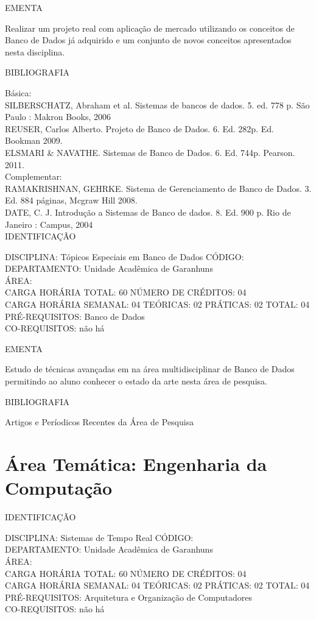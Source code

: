 \documentclass[
	12pt,				%
	openright,			%
  oneside,     %
	a4paper,			%
	chapter=TITLE,		%
	english,			%
	french,				%
	spanish,			%
	brazil				%
	]{abntex2}
\begin{document}
\begin{apendicesenv}
EMENTA 

Realizar um projeto real com aplicação de mercado utilizando os
conceitos de Banco de Dados já adquirido e um conjunto de novos
conceitos apresentados nesta disciplina.

BIBLIOGRAFIA 

Básica:\\
SILBERSCHATZ, Abraham et al. Sistemas de bancos de dados. 5. ed.
778 p. São Paulo : Makron Books, 2006\\
REUSER, Carlos Alberto. Projeto de Banco de Dados. 6. Ed. 282p.
Ed. Bookman 2009.\\
ELSMARI \& NAVATHE. Sistemas de Banco de Dados. 6. Ed. 744p.
Pearson. 2011.\\
Complementar:\\
RAMAKRISHNAN, GEHRKE. Sistema de Gerenciamento de Banco de Dados. 3. Ed.
884 páginas, Mcgraw Hill 2008.\\
DATE, C. J. Introdução a Sistemas de Banco de dados. 8. Ed. 900 p. Rio
de Janeiro : Campus, 2004\\

\newpage IDENTIFICAÇÃO

DISCIPLINA: Tópicos Especiais em Banco de Dados CÓDIGO:\\
DEPARTAMENTO: Unidade Acadêmica de Garanhuns\\
ÁREA: \\
CARGA HORÁRIA TOTAL: 60 NÚMERO DE CRÉDITOS: 04\\
CARGA HORÁRIA SEMANAL: 04 TEÓRICAS: 02 PRÁTICAS: 02 TOTAL: 04\\
PRÉ-REQUISITOS: Banco de Dados\\
CO-REQUISITOS: não há

EMENTA 

Estudo de técnicas avançadas em na área multidisciplinar de Banco de
Dados permitindo ao aluno conhecer o estado da arte nesta área de
pesquisa.

BIBLIOGRAFIA 

Artigos e Períodicos Recentes da Área de Pesquisa
\newpage 

\section*{Área Temática: Engenharia da Computação}

IDENTIFICAÇÃO

DISCIPLINA: Sistemas de Tempo Real CÓDIGO:\\
DEPARTAMENTO: Unidade Acadêmica de Garanhuns\\
ÁREA: \\
CARGA HORÁRIA TOTAL: 60 NÚMERO DE CRÉDITOS: 04\\
CARGA HORÁRIA SEMANAL: 04 TEÓRICAS: 02 PRÁTICAS: 02 TOTAL: 04\\
PRÉ-REQUISITOS: Arquitetura e Organização de Computadores\\
CO-REQUISITOS: não há


\end{apendicesenv}
\end{document}
